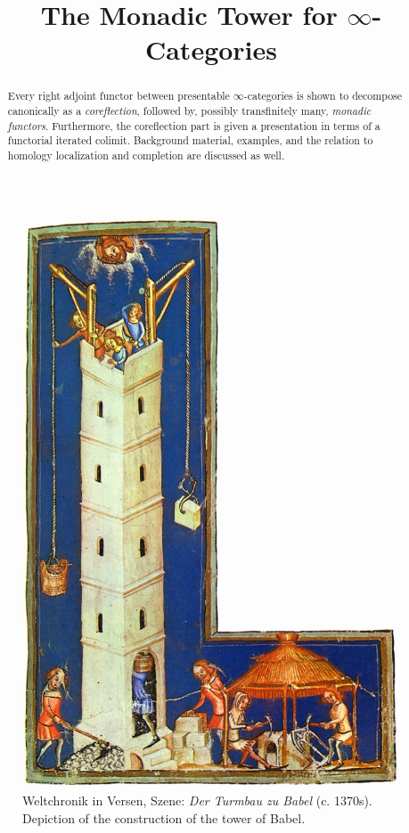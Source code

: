 \documentclass[english]{article}
\begin{document}
\title{The Monadic Tower for $\infty$-Categories}
\maketitle

\begin{abstract}
    Every right adjoint functor between presentable $\infty$-categories is shown to decompose canonically as a \textit{coreflection}, followed by, possibly transfinitely many,  \textit{monadic functors}. Furthermore, the coreflection part is given a presentation in terms of a functorial iterated colimit.  Background material, examples, and the relation to homology localization and completion are discussed as well. 
\end{abstract}

\begin{figure}[H]
    \centering{}
    \includegraphics[scale=0.129]{Meister_der_Weltenchronik.jpg}
    \caption*{Weltchronik in Versen, Szene: \textit{Der Turmbau zu Babel} (c. 1370s). Depiction of the construction of the tower of Babel.}
\end{figure}
\end{document}
